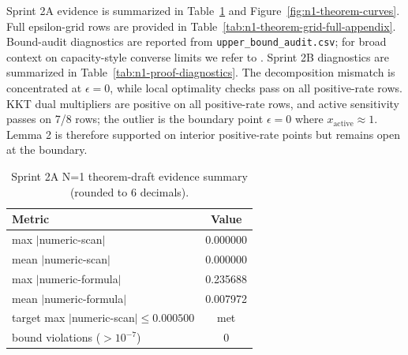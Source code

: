 \documentclass[a4paper,twocolumn,11pt,unpublished]{quantumarticle}
\begin{document}
Sprint 2A evidence is summarized in
Table~\ref{tab:n1-theorem-summary} and
Figure~\ref{fig:n1-theorem-curves}. Full epsilon-grid rows are provided in
Table~\ref{tab:n1-theorem-grid-full-appendix}. Bound-audit diagnostics are
reported from \texttt{upper\_bound\_audit.csv}; for broad context on
capacity-style converse limits we refer to \cite{PirandolaAOP2020}.
Sprint 2B diagnostics are summarized in
Table~\ref{tab:n1-proof-diagnostics}. The decomposition mismatch is concentrated
at $\epsilon=0$, while local optimality checks pass on all positive-rate rows.
KKT dual multipliers are positive on all positive-rate rows, and active
sensitivity passes on 7/8 rows; the outlier is the boundary point
$\epsilon=0$ where $x_{\mathrm{active}}\approx 1$.
Lemma 2 is therefore supported on interior positive-rate points but remains
open at the boundary.

\begin{table}[ht]
\centering
\scriptsize
\caption{Sprint 2A N=1 theorem-draft evidence summary (rounded to 6 decimals).}
\label{tab:n1-theorem-summary}
\begin{tabular}{lc}
\hline
Metric & Value \\
\hline
max $|$numeric-scan$|$ & 0.000000 \\
mean $|$numeric-scan$|$ & 0.000000 \\
max $|$numeric-formula$|$ & 0.235688 \\
mean $|$numeric-formula$|$ & 0.007972 \\
target max $|$numeric-scan$| \le 0.000500$ & met \\
bound violations ($>10^{-7}$) & 0 \\
\hline
\end{tabular}
\end{table}
\end{document}
